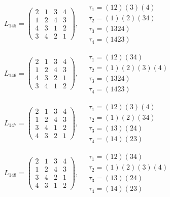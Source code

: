 $L_{145} = \begin{pmatrix} 2 & 1 & 3 & 4 \\ 1 & 2 & 4 & 3 \\ 4 & 3 & 1 & 2 \\ 3 & 4 & 2 & 1 \end{pmatrix}, \quad \begin{matrix} \tau_{1} = (1 2)(3)(4) \\ \tau_{2} = (1)(2)(3 4) \\ \tau_{3} = (1 3 2 4) \\ \tau_{4} = (1 4 2 3) \end{matrix}$

$L_{146} = \begin{pmatrix} 2 & 1 & 3 & 4 \\ 1 & 2 & 4 & 3 \\ 4 & 3 & 2 & 1 \\ 3 & 4 & 1 & 2 \end{pmatrix}, \quad \begin{matrix} \tau_{1} = (1 2)(3 4) \\ \tau_{2} = (1)(2)(3)(4) \\ \tau_{3} = (1 3 2 4) \\ \tau_{4} = (1 4 2 3) \end{matrix}$

$L_{147} = \begin{pmatrix} 2 & 1 & 3 & 4 \\ 1 & 2 & 4 & 3 \\ 3 & 4 & 1 & 2 \\ 4 & 3 & 2 & 1 \end{pmatrix}, \quad \begin{matrix} \tau_{1} = (1 2)(3)(4) \\ \tau_{2} = (1)(2)(3 4) \\ \tau_{3} = (1 3)(2 4) \\ \tau_{4} = (1 4)(2 3) \end{matrix}$

$L_{148} = \begin{pmatrix} 2 & 1 & 3 & 4 \\ 1 & 2 & 4 & 3 \\ 3 & 4 & 2 & 1 \\ 4 & 3 & 1 & 2 \end{pmatrix}, \quad \begin{matrix} \tau_{1} = (1 2)(3 4) \\ \tau_{2} = (1)(2)(3)(4) \\ \tau_{3} = (1 3)(2 4) \\ \tau_{4} = (1 4)(2 3) \end{matrix}$

